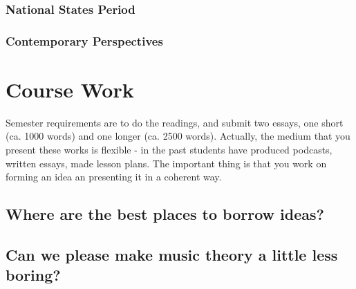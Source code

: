 \documentclass[11pt]{article}
\begin{document}
\subsubsection{National States Period}
\label{sec:orgcdbb95c}
\subsubsection{Contemporary Perspectives}
\label{sec:orgd21c43a}


\section{Course Work}
\label{sec:org15a5c9d}
Semester requirements are to do the readings, and submit two essays,
one short (ca. 1000 words) and one longer (ca. 2500 words). Actually,
the medium that you present these works is flexible - in the past
students have produced podcasts, written essays, made lesson
plans. The important thing is that you work on forming an idea an
presenting it in a coherent way.

\subsection{Where are the best places to borrow ideas?}
\label{sec:orge00069d}
\subsection{Can we please make music theory a little less boring?}
\label{sec:orgf99f6a7}
\end{document}
